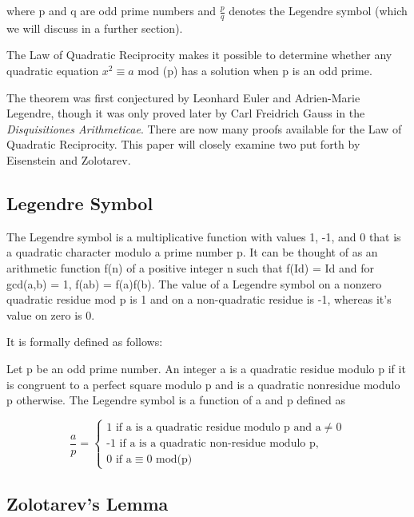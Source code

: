 \documentclass{article}
\begin{document}
\begin{spacing}{1.1}
where p and q are odd prime numbers and $\frac{p}{q}$ denotes the Legendre symbol (which we will discuss in a further section).  

The Law of Quadratic Reciprocity makes it possible to determine whether any quadratic equation $x^2 \equiv a$ mod (p) has a solution when p is an odd prime.  

The theorem was first conjectured by Leonhard Euler and Adrien-Marie Legendre, though it was only proved later by Carl Freidrich Gauss in the \textit{Disquisitiones Arithmeticae}.  There are now many proofs available for the Law of Quadratic Reciprocity.  This paper will closely examine two put forth by Eisenstein and Zolotarev.  

\subsection{Legendre Symbol}

The Legendre symbol is a multiplicative function with values 1, -1, and 0 that is a quadratic character modulo a prime number p.  It can be thought of as an arithmetic function f(n) of a positive integer n such that f(Id) = Id and for gcd(a,b) = 1, f(ab) = f(a)f(b).  The value of a Legendre symbol on a nonzero quadratic residue mod p is 1 and on a non-quadratic residue is -1, whereas it's value on zero is 0.  

\vspace{2mm}
It is formally defined as follows: 

\begin{flushleft}

Let p be an odd prime number.  An integer a is a quadratic residue modulo p if it is congruent to a perfect square modulo p and is a quadratic nonresidue modulo p otherwise.  The Legendre symbol is a function of a and p defined as
\end{flushleft}

$$
\frac{a}{p} = \begin{cases}
					\text{1 if a is a quadratic residue modulo p and a} \neq 0 \\
					\text{-1 if a is a quadratic non-residue modulo p,} \\
					\text{0 if a} \equiv 0\text{ mod(p)} \end{cases} 
					$$

\subsection{Zolotarev's Lemma}


\end{spacing}
\end{document}
